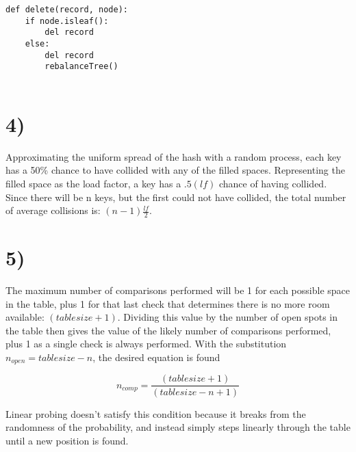 \documentclass[a4paper,11pt]{article}
\begin{document}
\begin{verbatim}
def delete(record, node):    
    if node.isleaf():
        del record
    else:
        del record
        rebalanceTree()
        
\end{verbatim}


\section*{4)}
Approximating the uniform spread of the hash with a random process, each key has a 50\% chance to have collided with any of the filled spaces.  Representing the filled space as the load factor, a key has a $.5 (lf)$  chance of having collided.  Since there will be n keys, but the first could not have collided, the total number of average collisions is: $(n-1)\frac{lf}{2}$.


\section*{5)}
The maximum number of comparisons performed will be 1 for each possible space in the table, plus 1 for that last check that determines there is no more room available: $(tablesize + 1)$.  Dividing this value by the number of open spots in the table then gives the value of the likely number of comparisons performed, plus 1 as a single check is always performed.  With the substitution $n_{open} = tablesize - n$, the desired equation is found  


\begin{equation}
n_{comp} = \frac{(tablesize + 1)}{(tablesize - n + 1)}
\end{equation}

Linear probing doesn't satisfy this condition because it breaks from the randomness of the probability, and instead simply steps linearly through the table until a new position is found.

\end{document}
